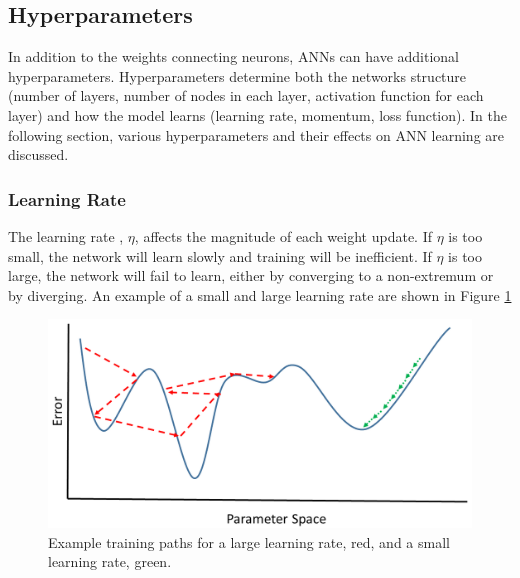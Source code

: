 



\subsection{Hyperparameters}

In addition to the weights connecting neurons, ANNs can have additional hyperparameters. Hyperparameters determine both the networks structure (number of layers, number of nodes in each layer, activation function for each layer) and how the model learns (learning rate, momentum, loss function). In the following section, various hyperparameters and their effects on ANN learning are discussed.

\subsubsection{Learning Rate} \label{LearningRateSubsection}

The learning rate , $\eta$, affects the magnitude of each weight update. If $\eta$ is too small, the network will learn slowly and training will be inefficient. If $\eta$ is too large, the network will fail to learn, either by converging to a non-extremum or by diverging. An example of a small and large learning rate are shown in Figure \ref{fig:Learning_rate_comparison} 

\begin{figure}[H]
	\centering
	\includegraphics[width=0.8\linewidth]{images/Learning_rate_comparison_v2}
	\caption{Example training paths for a large learning rate, red, and a small learning rate, green.}
	\label{fig:Learning_rate_comparison}
\end{figure}


